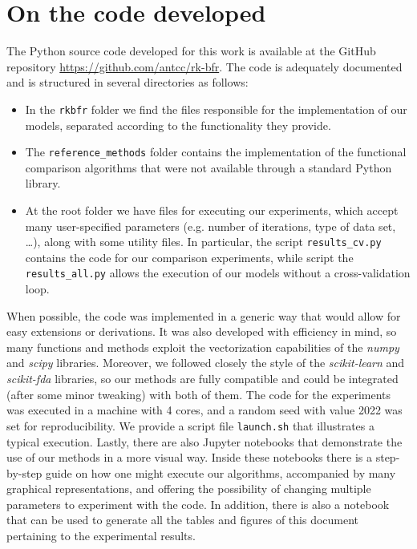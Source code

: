 %
%

\chapter{On the code developed}\label{ch:code}

The Python source code developed for this work is available at the GitHub repository \url{https://github.com/antcc/rk-bfr}. The code is adequately documented and is structured in several directories as follows:

\begin{itemize}
  \item In the \texttt{rkbfr} folder we find the files responsible for the implementation of our models, separated according to the functionality they provide.
  \item The \texttt{reference\_methods} folder contains the implementation of the functional comparison algorithms that were not available through a standard Python library.
  \item At the root folder we have files for executing our experiments, which accept many user-specified parameters (e.g. number of iterations, type of data set, \ldots), along with some utility files. In particular, the script \texttt{results\_cv.py} contains the code for our comparison experiments, while script the \texttt{results\_all.py} allows the execution of our models without a cross-validation loop.
\end{itemize}

When possible, the code was implemented in a generic way that would allow for easy extensions or derivations. It was also developed with efficiency in mind, so many functions and methods exploit the vectorization capabilities of the \textit{numpy} and \textit{scipy} libraries. Moreover, we followed closely the style of the \textit{scikit-learn} and \textit{scikit-fda} libraries, so our methods are fully compatible and could be integrated (after some minor tweaking) with both of them. The code for the experiments was executed in a machine with 4 cores, and a random seed with value 2022 was set for reproducibility. We provide a script file \texttt{launch.sh} that illustrates a typical execution. Lastly, there are also Jupyter notebooks that demonstrate the use of our methods in a more visual way. Inside these notebooks there is a step-by-step guide on how one might execute our algorithms, accompanied by many graphical representations, and offering the possibility of changing multiple parameters to experiment with the code. In addition, there is also a notebook that can be used to generate all the tables and figures of this document pertaining to the experimental results.
